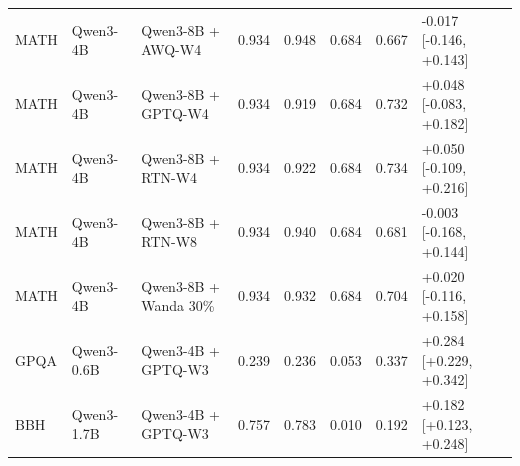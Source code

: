 \begin{tabular}{lllrrrrl}
MATH & Qwen3-4B & Qwen3-8B + AWQ-W4 & 0.934 & 0.948 & 0.684 & 0.667 & -0.017 [-0.146, +0.143] \\
MATH & Qwen3-4B & Qwen3-8B + GPTQ-W4 & 0.934 & 0.919 & 0.684 & 0.732 & +0.048 [-0.083, +0.182] \\
MATH & Qwen3-4B & Qwen3-8B + RTN-W4 & 0.934 & 0.922 & 0.684 & 0.734 & +0.050 [-0.109, +0.216] \\
MATH & Qwen3-4B & Qwen3-8B + RTN-W8 & 0.934 & 0.940 & 0.684 & 0.681 & -0.003 [-0.168, +0.144] \\
MATH & Qwen3-4B & Qwen3-8B + Wanda 30\% & 0.934 & 0.932 & 0.684 & 0.704 & +0.020 [-0.116, +0.158] \\
GPQA & Qwen3-0.6B & Qwen3-4B + GPTQ-W3 & 0.239 & 0.236 & 0.053 & 0.337 & +0.284 [+0.229, +0.342] \\
BBH & Qwen3-1.7B & Qwen3-4B + GPTQ-W3 & 0.757 & 0.783 & 0.010 & 0.192 & +0.182 [+0.123, +0.248] \\
\bottomrule
\end{tabular}
